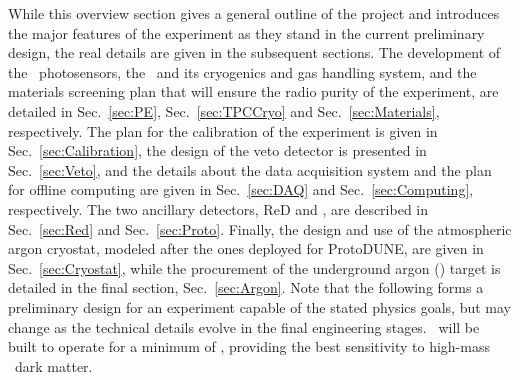 While this overview section gives a general outline of the project and introduces the major features of the experiment as they stand in the current preliminary design, the real details are given in the subsequent sections. The development of the \SiPM\ photosensors, the \LArTPC\ and its cryogenics and gas handling system, and the materials screening plan that will ensure the radio purity of the experiment, are detailed in Sec.~\ref{sec:PE}, Sec.~\ref{sec:TPCCryo} and Sec.~\ref{sec:Materials}, respectively.  The plan for the calibration of the experiment is given in Sec.~\ref{sec:Calibration}, the design of the veto detector is presented in Sec.~\ref{sec:Veto}, and the details about the data acquisition system and the plan for offline computing are given in Sec.~\ref{sec:DAQ} and Sec.~\ref{sec:Computing}, respectively.  The two ancillary detectors, ReD and \DSp, are described in Sec.~\ref{sec:Red} and Sec.~\ref{sec:Proto}.  Finally, the design and use of the atmospheric argon cryostat, modeled after the ones deployed for ProtoDUNE, are given in Sec.~\ref{sec:Cryostat}, while the procurement of the underground argon (\UAr) target is detailed in the final section, Sec.~\ref{sec:Argon}.  Note that the following forms a preliminary design for an experiment capable of the stated physics goals, but may change as the technical details evolve in the final engineering stages.  \DSks\ will be built to operate for a minimum of \DSkExtendedRunTimePlanned, providing the best sensitivity to high-mass \WIMP\ dark matter.

